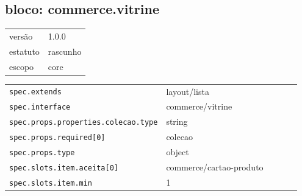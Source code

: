 \subsection*{bloco: commerce.vitrine}
\begin{tabular}{@{}ll@{}}
versão & 1.0.0 \\
estatuto & rascunho \\
escopo & core \\
\end{tabular}

\begin{tabular}{@{}p{0.35\linewidth}p{0.6\linewidth}@{}}
\texttt{spec.extends} & layout/lista \\
\texttt{spec.interface} & commerce/vitrine \\
\texttt{spec.props.properties.colecao.type} & string \\
\texttt{spec.props.required[0]} & colecao \\
\texttt{spec.props.type} & object \\
\texttt{spec.slots.item.aceita[0]} & commerce/cartao-produto \\
\texttt{spec.slots.item.min} & 1 \\
\end{tabular}
